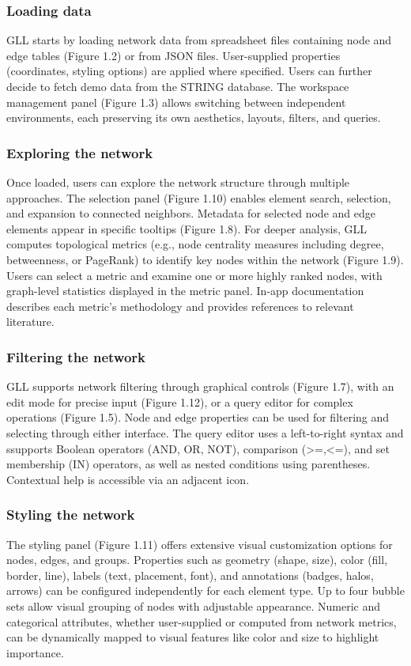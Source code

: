 \subsubsection{Loading data}
GLL starts by loading network data from spreadsheet files containing node and edge tables (Figure 1.2) or from JSON files. User-supplied properties (coordinates, styling options) are applied where specified. Users can further decide to fetch demo data from the STRING database. The workspace management panel (Figure 1.3) allows switching between independent environments, each preserving its own aesthetics, layouts, filters, and queries.

\subsubsection{Exploring the network}
Once loaded, users can explore the network structure through multiple approaches. The selection panel (Figure 1.10) enables element search, selection, and expansion to connected neighbors. Metadata for selected node and edge elements appear in specific tooltips (Figure 1.8). For deeper analysis, GLL computes topological metrics (e.g., node centrality measures including degree, betweenness, or PageRank) to identify key nodes within the network (Figure 1.9). Users can select a metric and examine one or more highly ranked nodes, with graph-level statistics displayed in the metric panel. In-app documentation describes each metric's methodology and provides references to relevant literature.

\subsubsection{Filtering the network}
GLL supports network filtering through graphical controls (Figure 1.7), with an edit mode for precise input (Figure 1.12), or a query editor for complex operations (Figure 1.5). Node and edge properties can be used for filtering and selecting through either interface. The query editor uses a left-to-right syntax and ssupports Boolean operators (AND, OR, NOT), comparison (>=,<=), and set membership (IN) operators, as well as nested conditions using parentheses. Contextual help is accessible via an adjacent icon.

\subsubsection{Styling the network}
The styling panel (Figure 1.11) offers extensive visual customization options for nodes, edges, and groups.  Properties such as geometry (shape, size), color (fill, border, line), labels (text, placement, font), and annotations (badges, halos, arrows) can be configured independently for each element type. Up to four bubble sets allow visual grouping of nodes with adjustable appearance. Numeric and categorical attributes, whether user-supplied or computed from network metrics, can be dynamically mapped to visual features like color and size to highlight importance.

